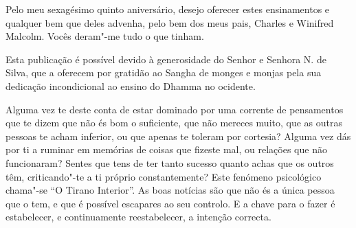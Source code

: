 \clearpage
\thispagestyle{empty}

{}

\vspace*{0.8\baselineskip}

Pelo meu sexagésimo quinto aniversário, desejo oferecer estes
ensinamentos e qualquer bem que deles advenha, pelo bem dos meus pais,
Charles e Winifred Malcolm. Vocês deram"-me tudo o que tinham.

\clearpage
\thispagestyle{empty}

{}

\enlargethispage*{\baselineskip}

\vspace*{0.8\baselineskip}

Esta publicação é possível devido à generosidade do Senhor e Senhora N.
de Silva, que a oferecem por gratidão ao Sangha de monges e monjas pela
sua dedicação incondicional ao ensino do Dhamma no ocidente.

Alguma vez te deste conta de estar dominado por uma corrente de
pensamentos que te dizem que não és bom o suficiente, que não mereces
muito, que as outras pessoas te acham inferior, ou que apenas te toleram
por cortesia? Alguma vez dás por ti a ruminar em memórias de coisas que
fizeste mal, ou relações que não funcionaram? Sentes que tens de ter
tanto sucesso quanto achas que os outros têm, criticando"-te a ti próprio
constantemente? Este fenómeno psicológico chama"-se “O Tirano Interior”.
As boas notícias são que não és a única pessoa que o tem, e que é
possível escapares ao seu controlo. E a chave para o fazer é
estabelecer, e continuamente reestabelecer, a intenção correcta.

